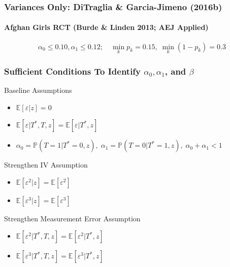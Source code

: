 \documentclass{beamer}
\begin{document}
\begin{frame}
  \frametitle{Variances Only: DiTraglia \& Garcia-Jimeno (2016b)}
  \framesubtitle{Afghan Girls RCT (Burde \& Linden 2013; AEJ Applied)}
  \vspace{-2em}
\[\alpha_0 \leq 0.10, \alpha_1 \leq 0.12; \quad
  \min_k p_k = 0.15,\; \min_k (1 - p_k)= 0.3
\]

  \vspace{-4em}
\begin{figure}[htbp]
  \footnotesize
  \centering
  
\end{figure}
\end{frame}
\begin{frame}
  \frametitle{Sufficient Conditions To Identify $\alpha_0, \alpha_1$, and $\beta$}
  \small

  \begin{block}{Baseline Assumptions}
  \vspace{-1em}
    \begin{itemize}
      \item $\mathbb{E}[\varepsilon|z] =0$
      \item $\mathbb{E}[\varepsilon|T^*,T,z] = \mathbb{E}[\varepsilon|T^*,z]$
      \item $\alpha_0 = \mathbb{P}(T=1|T^*=0,z), \; \alpha_1 =\mathbb{P}(T=0|T^*=1, z), \; \alpha_0 + \alpha_1 < 1$
    \end{itemize}
  \end{block}

  \vspace{-1em}
  
  \begin{alertblock}{Strengthen IV Assumption}
  \vspace{-1em}
    \begin{itemize}
      \item $\mathbb{E}[\varepsilon^2|z] = \mathbb{E}[\varepsilon^2]$  
      \item $\mathbb{E}[\varepsilon^3|z] = \mathbb{E}[\varepsilon^3]$  
    \end{itemize}
  \end{alertblock}

  \vspace{-1em}
  \begin{alertblock}{Strengthen Measurement Error Assumption}
  \vspace{-1em}
    \begin{itemize}
      \item $\mathbb{E}[\varepsilon^2|T^*,T,z] = \mathbb{E}[\varepsilon^2|T^*,z]$  
      \item $\mathbb{E}[\varepsilon^3|T^*,T,z] = \mathbb{E}[\varepsilon^3|T^*,z]$  
    \end{itemize}

  \end{alertblock}

\end{frame}
\end{document}
